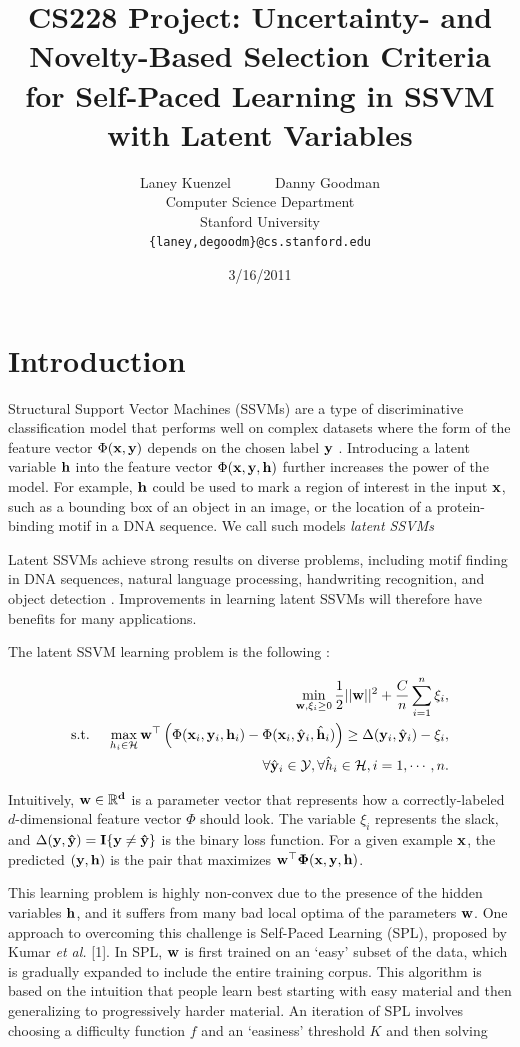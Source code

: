 \documentclass{article}
\title{CS228 Project: Uncertainty- and Novelty-Based Selection Criteria for Self-Paced Learning in SSVM with Latent Variables}
\date{3/16/2011}
\author{
Laney Kuenzel ~~~~~ Danny Goodman\\
Computer Science Department \\
Stanford University \\
\texttt{\{laney,degoodm\}@cs.stanford.edu}
}
\newcommand{\mysection}[1]{\vspace{-4mm}\section{#1}\vspace{-4mm}}
\begin{document}
\maketitle
\vspace{-8mm}

\mysection{Introduction}
\label{sec:introduction}
Structural Support Vector Machines (SSVMs) are a type of discriminative classification model that performs well on complex datasets where the form of the feature vector $\Phi(\bf x, \bf y)$ depends on the chosen label $\bf y$ \cite{SSVM}.  Introducing a latent variable $\bf h$ into the feature vector $\Phi(\bf x, \bf y, \bf h)$ further increases the power of the model.  For example, $\bf h$ could be used to mark a region of interest in the input $\bf x$, such as a bounding box of an object in an image, or the location of a protein-binding motif in a DNA sequence.  We call such models \emph{latent SSVMs}

Latent SSVMs achieve strong results on diverse problems, including motif finding in DNA sequences, natural language processing, handwriting recognition, and object detection \cite{SPL,App1,SSVM}.  Improvements in learning latent SSVMs will therefore have benefits for many applications.

The latent SSVM learning problem is the following \cite{SPL}:

\begin{eqnarray}
&&\min_{{\bf w},\xi_i \geq 0} \frac{1}{2}||{\bf w}||^2 + \frac{C}{n} \sum_{i=1}^n \xi_i, \nonumber \\
\mbox{s.t. } && \max_{h_i \in {\cal H}} {\bf w}^\top \left(\Phi({\bf x}_i,{\bf y}_i,{\bf h}_i) - 
		\Phi({\bf x}_i,\hat{\bf y}_i,\hat{\bf h}_i) \right)
	 \geq \Delta({\bf y}_i,\hat{\bf y}_i) - \xi_i, \nonumber \\
\label{eq:latentSSVM}
&&\forall \hat{\bf y}_i \in {\cal Y}, \forall \hat{h}_i \in {\cal H}, i=1,\cdots,n.
\end{eqnarray}

Intuitively, $\bf w\in\mathbb{R}^d$ is a parameter vector that represents how a correctly-labeled $d$-dimensional feature vector $\Phi$ should look.  The variable $\xi_i$ represents the slack, and $\Delta(\bf y,\hat{\bf y})=I\{\bf y\neq \hat{\bf y}\}$ is the binary loss function.
For a given example $\bf x$, the predicted $(\bf y,\bf h)$ is the pair that maximizes $\bf{{w}} ^\top \Phi(\bf x,\bf y,\bf h)$.  

This learning problem is highly non-convex due to the presence of the hidden variables $\bf h$, and it suffers from many bad local optima of the parameters $\bf w$.  One approach to overcoming this challenge is Self-Paced Learning (SPL), proposed by Kumar \textit{et al.} [1]. In SPL, $\bf w$ is first trained on an `easy' subset of the data, which is gradually expanded to include the entire training corpus.  This algorithm is based on the intuition that people learn best starting with easy material and then generalizing to progressively harder material.  An iteration of SPL involves choosing a difficulty function $f$ and an `easiness' threshold $K$ and then solving
\end{document}
